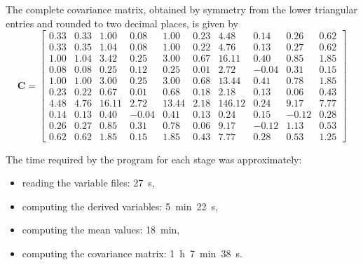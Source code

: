 \clearpage

The complete covariance matrix, obtained by symmetry from the lower triangular entries and rounded to two decimal places, is given by
\begin{equation}
    \mathbf{C}=
    \begin{bmatrix}
        0.33 & 0.33 & 1.00 & 0.08 & 1.00 & 0.23 & 4.48 & 0.14 & 0.26 & 0.62 \\
        0.33 & 0.35 & 1.04 & 0.08 & 1.00 & 0.22 & 4.76 & 0.13 & 0.27 & 0.62 \\
        1.00 & 1.04 & 3.42 & 0.25 & 3.00 & 0.67 & 16.11 & 0.40 & 0.85 & 1.85 \\
        0.08 & 0.08 & 0.25 & 0.12 & 0.25 & 0.01 & 2.72 & -0.04 & 0.31 & 0.15 \\
        1.00 & 1.00 & 3.00 & 0.25 & 3.00 & 0.68 & 13.44 & 0.41 & 0.78 & 1.85 \\
        0.23 & 0.22 & 0.67 & 0.01 & 0.68 & 0.18 & 2.18 & 0.13 & 0.06 & 0.43 \\
        4.48 & 4.76 & 16.11 & 2.72 & 13.44 & 2.18 & 146.12 & 0.24 & 9.17 & 7.77 \\
        0.14 & 0.13 & 0.40 & -0.04 & 0.41 & 0.13 & 0.24 & 0.15 & -0.12 & 0.28 \\
        0.26 & 0.27 & 0.85 & 0.31 & 0.78 & 0.06 & 9.17 & -0.12 & 1.13 & 0.53 \\
        0.62 & 0.62 & 1.85 & 0.15 & 1.85 & 0.43 & 7.77 & 0.28 & 0.53 & 1.25
    \end{bmatrix}
\end{equation}

The time required by the program for each stage was approximately:
\begin{itemize}
    \item reading the variable files: 27~s,
    \item computing the derived variables: 5~min~22~s,
    \item computing the mean values: 18~min,
    \item computing the covariance matrix: 1~h~7~min~38~s.
\end{itemize}